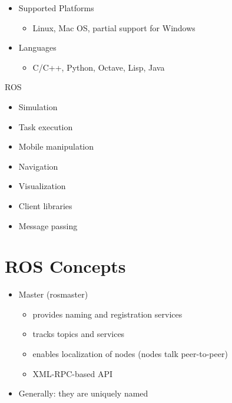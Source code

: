 \lyxframeend{}


\lyxframeend{}
\begin{itemize}
\item Supported Platforms

\begin{itemize}
\item Linux, Mac OS, partial support for Windows
\end{itemize}
\end{itemize}

\pause{}
\begin{itemize}
\item Languages

\begin{itemize}
\item C/C++, Python, Octave, Lisp, Java
\end{itemize}
\end{itemize}

\lyxframeend{}


\lyxframeend{}

ROS
\begin{itemize}
\item Simulation
\item Task execution
\item Mobile manipulation
\item Navigation
\item Visualization
\item Client libraries
\item Message passing
\end{itemize}

\lyxframeend{}


\lyxframeend{}\section{ROS Concepts}


\lyxframeend{}
\begin{itemize}
\item Master (rosmaster)

\begin{itemize}
\item provides naming and registration services
\item tracks topics and services
\item enables localization of nodes (nodes talk peer-to-peer)
\item XML-RPC-based API
\end{itemize}
\item Generally: they are uniquely named
\end{itemize}


